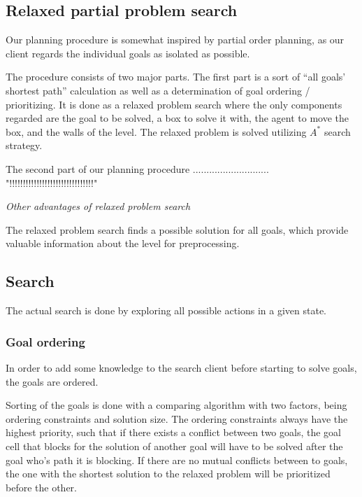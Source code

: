 \documentclass[Main]{subfiles}
\begin{document}
\subsection{Relaxed partial problem search}

Our planning procedure is somewhat inspired by partial order planning, as our client regards the individual goals as isolated as possible. 

The procedure consists of two major parts. The first part is a sort of ``all goals' shortest path'' calculation as well as a determination of goal ordering / prioritizing. 
It is done as a relaxed problem search where the only components regarded are the goal to be solved, a box to solve it with, the agent to move the box, and the walls of the level. The relaxed problem is solved utilizing $A^*$ search strategy. 


The second part of our planning procedure  ............................ "!!!!!!!!!!!!!!!!!!!!!!!!!!!!!!!"


\textit{Other advantages of relaxed problem search}

The relaxed problem search finds a possible solution for all goals, which provide valuable information about the level for preprocessing. 




\subsection{Search} 
The actual search is done by exploring all possible actions in a given state. 



\subsubsection{Goal ordering}
\label{sec:goal_ordering}
In order to add some knowledge to the search client before starting to solve goals, the goals are ordered. 

Sorting of the goals is done with a comparing algorithm with two factors, being ordering constraints and solution size. The ordering constraints always have the highest priority, such that if there exists a conflict between two goals, the goal cell that blocks for the solution of another goal will have to be solved after the goal who's path it is blocking. If there are no mutual conflicts between to goals, the one with the shortest solution to the relaxed problem will be prioritized before the other. 
\end{document}
